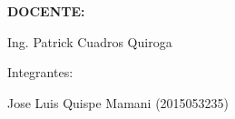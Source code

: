 \documentclass[12pt, letterpaper]{article}
\begin{document}
\begin{titlepage}
\begin{center}
		\vspace*{0.3in}
			\begin{large}
				\textbf{DOCENTE:} \\
			\end{large}

		\vspace*{0.1in}
			\begin{large}
				Ing. Patrick Cuadros Quiroga \\
			\end{large}

		\vspace*{0.2in}
			\vspace*{0.1in}
				\begin{large}
					Integrantes: \\
					\begin{flushleft}
						Jose Luis Quispe Mamani	\hfill	(2015053235) \\
					\end{flushleft}
				\end{large}
	\end{center}
\end{titlepage}

\tableofcontents %
	\thispagestyle{empty} %
		\newpage
			\setcounter{page}{1}%
				
				
				
				
\end{document}
